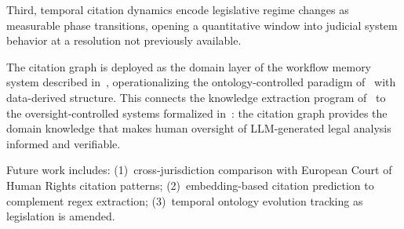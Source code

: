 \documentclass[11pt]{article}
\begin{document}
Third, temporal citation dynamics encode legislative regime changes as measurable phase transitions, opening a quantitative window into judicial system behavior at a resolution not previously available.

The citation graph is deployed as the domain layer of the workflow memory system described in~\citet{ovcharov2026workflowmemory}, operationalizing the ontology-controlled paradigm of~\citet{palagin2006architecture} with data-derived structure.
This connects the knowledge extraction program of~\citet{palagin2012knowledge} to the oversight-controlled systems formalized in~\citet{ovcharov2026bridge}: the citation graph provides the domain knowledge that makes human oversight of LLM-generated legal analysis informed and verifiable.

Future work includes: (1)~cross-jurisdiction comparison with European Court of Human Rights citation patterns; (2)~embedding-based citation prediction to complement regex extraction; (3)~temporal ontology evolution tracking as legislation is amended.




\end{document}
